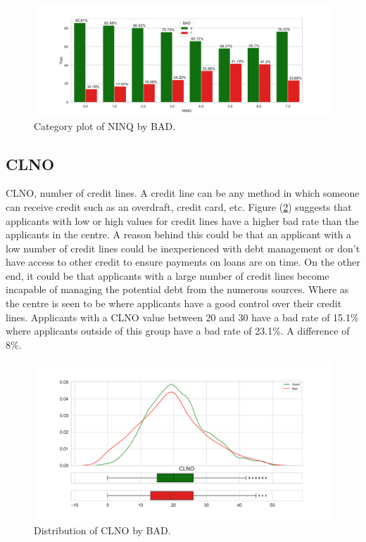 \begin{figure}[H]
	\centering
	\includegraphics[scale=0.40]{figs/ninq_cat.pdf}
	\caption{Category plot of NINQ by BAD. \label{ninq_cat}}
\end{figure}

\subsection*{CLNO}

CLNO, number of credit lines. A credit line can be any method in which someone can receive credit such as an overdraft, credit card, etc. Figure (\ref{clno_dist}) suggests that applicants with low or high values for credit lines have a higher bad rate than the applicants in the centre. A reason behind this could be that an applicant with a low number of credit lines could be inexperienced with debt management or don't have access to other credit to ensure payments on loans are on time. On the other end, it could be that applicants with a large number of credit lines become incapable of managing the potential debt from the numerous sources. Where as the centre is seen to be where applicants have a good control over their credit lines. Applicants with a CLNO value between 20 and 30 have a bad rate of 15.1\% where applicants outside of this group have a bad rate of 23.1\%. A difference of 8\%.

\begin{figure}[H]
	\centering
	\includegraphics[scale=0.40]{figs/clno_dist.pdf}
	\caption{Distribution of CLNO by BAD. \label{clno_dist}}
\end{figure}

